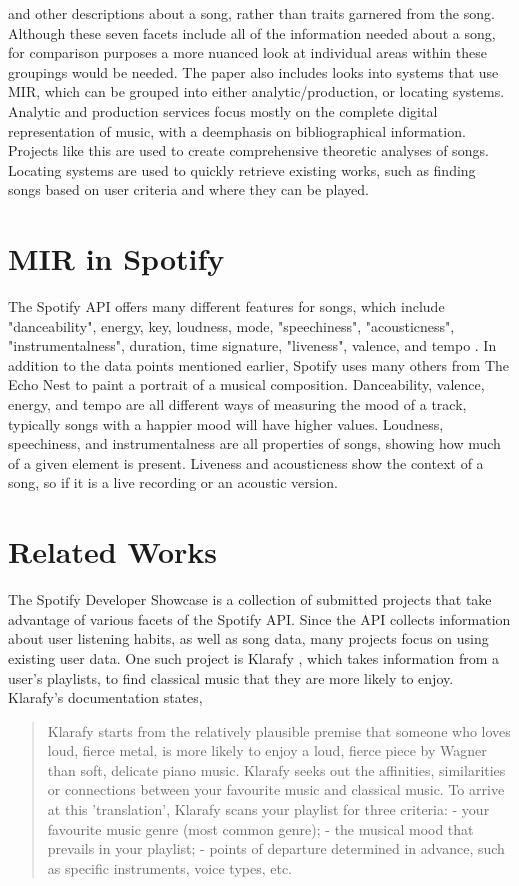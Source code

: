 and other descriptions about a song, rather than traits garnered from the song. Although these
seven facets include all of the information needed about a song, for comparison purposes a more
nuanced look at individual areas within these groupings would be needed. The paper also includes
looks into systems that use MIR, which can be grouped into either analytic/production, or locating
systems. Analytic and production services focus mostly on the complete digital representation of
music, with a deemphasis on bibliographical information. Projects like this are used to create
comprehensive theoretic analyses of songs. Locating systems are used to quickly retrieve existing
works, such as finding songs based on user criteria and where they can be played.

\section{MIR in Spotify}
The Spotify API offers many different features for songs, which include "danceability",
energy, key, loudness, mode, "speechiness", "acousticness", "instrumentalness", duration,
time signature, "liveness", valence, and tempo \cite{Dev:18}. In addition to the data points mentioned
earlier, Spotify uses many others from The Echo Nest to paint a portrait of a musical
composition. Danceability, valence, energy, and tempo
are all different ways of measuring the mood of a track, typically songs with a happier
mood will have higher values. Loudness, speechiness, and instrumentalness are all properties
of songs, showing how much of a given element is present.  Liveness and acousticness show the
context of a song, so if it is a live recording or an acoustic version.

\section{Related Works}

The Spotify Developer Showcase \cite{Spotify:19} is a collection of submitted
projects that take advantage of various facets of the Spotify API. Since the
API collects information about user listening habits, as well as song data, many
projects focus on using existing user data. One such project is Klarafy
\cite{DeBock:17}, which takes information from a user's playlists, to find
classical music that they are more likely to enjoy. Klarafy's documentation states,

\begin{quote}
Klarafy starts from the relatively plausible premise that someone who loves loud,
fierce metal, is more likely to enjoy a loud, fierce piece by Wagner than soft,
delicate piano music. Klarafy seeks out the affinities, similarities or
connections between your favourite music and classical music.
To arrive at this 'translation', Klarafy scans your playlist for three criteria:
- your favourite music genre (most common genre);
- the musical mood that prevails in your playlist;
- points of departure determined in advance, such as specific instruments,
voice types, etc.
\end{quote}

